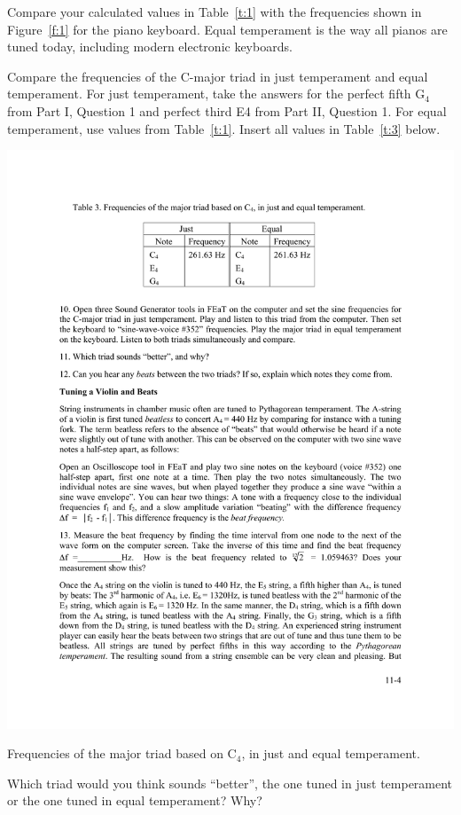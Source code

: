 \documentclass[11pt]{NSF}
\begin{document}
\item
Compare your calculated values in Table~\ref{t:1} with the frequencies shown
in Figure~\ref{f:1} for the piano keyboard.
Equal temperament is the way all pianos are tuned today, including
modern electronic keyboards.

\item 
Compare the frequencies of the C-major triad in just temperament and
equal temperament. For just temperament, take the answers for the
perfect fifth G$_4$ from Part I, Question 1 and perfect third E4 
from Part II, Question 1. For equal temperament, use values from Table~\ref{t:1}. 
Insert all values in Table~\ref{t:3} below.
%
\begin{table}[hbtp]
\begin{center}
\includegraphics[width=.45\textwidth]{tab11_3}
\caption{Frequencies of the major triad based on C$_4$, 
in just and equal temperament.}
\label{t:3}
\end{center}
\end{table}
%

\item
Which triad would you think sounds “better”, the one tuned in just
temperament or the one tuned in equal temperament? 
Why?
\end{document}
